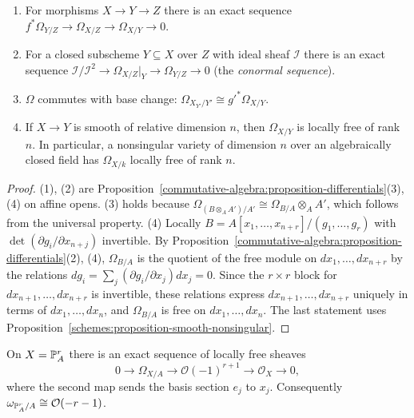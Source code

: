 \begin{proposition}\label{coherent-sheaves:proposition-differentials}
\begin{enumerate}
\item For morphisms $X \to Y \to Z$ there is an exact sequence $f^*\Omega_{Y/Z} \to \Omega_{X/Z} \to \Omega_{X/Y} \to 0$.
\item For a closed subscheme $Y \subseteq X$ over $Z$ with ideal sheaf $\mathcal{I}$ there is an exact sequence
$\mathcal{I}/\mathcal{I}^2 \to \Omega_{X/Z}|_Y \to \Omega_{Y/Z} \to 0$ (the \emph{conormal sequence}).
\item $\Omega$ commutes with base change: $\Omega_{X_{Y'}/Y'} \cong g'^*\Omega_{X/Y}$.
\item If $X \to Y$ is smooth of relative dimension $n$, then $\Omega_{X/Y}$ is locally free of rank $n$. In particular, a nonsingular variety of
dimension $n$ over an algebraically closed field has $\Omega_{X/k}$ locally free of rank $n$.
\end{enumerate}
\end{proposition}

\begin{proof}
(1), (2) are Proposition~\ref{commutative-algebra:proposition-differentials}(3), (4) on affine opens. (3) holds because
$\Omega_{(B \otimes_AA')/A'} \cong \Omega_{B/A} \otimes_AA'$, which follows from the universal property. (4) Locally
$B = A[x_1, \ldots, x_{n+r}]/(g_1, \ldots, g_r)$ with $\det(\partial g_i/\partial x_{n+j})$ invertible. By
Proposition~\ref{commutative-algebra:proposition-differentials}(2), (4), $\Omega_{B/A}$ is the quotient of the free module on $dx_1, \ldots, dx_{n+r}$ by the
relations $dg_i = \sum_j(\partial g_i/\partial x_j)dx_j = 0$. Since the $r \times r$ block for $dx_{n+1}, \ldots, dx_{n+r}$ is invertible, these relations express
$dx_{n+1}, \ldots, dx_{n+r}$ uniquely in terms of $dx_1, \ldots, dx_n$, and $\Omega_{B/A}$ is free on $dx_1, \ldots, dx_n$. The last statement uses
Proposition~\ref{schemes:proposition-smooth-nonsingular}.
\end{proof}

\begin{theorem}\label{coherent-sheaves:theorem-euler-sequence}
On $X = \mathbb{P}^r_A$ there is an exact sequence of locally free sheaves
\[
0 \to \Omega_{X/A} \to \mathcal{O}(-1)^{r+1} \to \mathcal{O}_X \to 0,
\]
where the second map sends the basis section $e_j$ to $x_j$. Consequently $\omega_{\mathbb{P}^r_A/A} \cong \mathcal{O}(-r-1)$.
\end{theorem}

